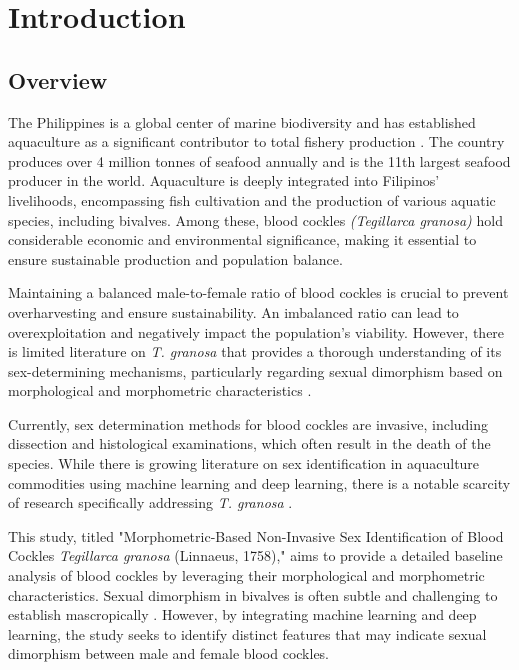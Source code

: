 \chapter{Introduction}
\label{sec:researchdesc}    %

\section{Overview}
\label{sec:overview}

The Philippines is a global center of marine biodiversity and has established aquaculture as a significant contributor to total fishery production \cite{aypa2000, bfar2019}. The country produces over 4 million tonnes of seafood annually and is the 11th largest seafood producer in the world. Aquaculture is deeply integrated into Filipinos' livelihoods, encompassing fish cultivation and the production of various aquatic species, including bivalves. Among these, blood cockles \textit{(Tegillarca granosa)} hold considerable economic and environmental significance, making it essential to ensure sustainable production and population balance.

Maintaining a balanced male-to-female ratio of blood cockles is crucial to prevent overharvesting and ensure sustainability. An imbalanced ratio can lead to overexploitation and negatively impact the population's viability. However, there is limited literature on \textit{T. granosa} that provides a thorough understanding of its sex-determining mechanisms, particularly regarding sexual dimorphism based on morphological and morphometric characteristics \cite{breton2017sex}.

Currently, sex determination methods for blood cockles are invasive, including dissection and histological examinations, which often result in the death of the species. While there is growing literature on sex identification in aquaculture commodities using machine learning and deep learning, there is a notable scarcity of research specifically addressing \textit{T. granosa} \cite{miranda2023}.

This study, titled "Morphometric-Based Non-Invasive Sex Identification of Blood Cockles \textit{Tegillarca granosa} (Linnaeus, 1758)," aims to provide a detailed baseline analysis of blood cockles by leveraging their morphological and morphometric characteristics. Sexual dimorphism in bivalves is often subtle and challenging to establish mascropically \cite{karapunar2021}. However, by integrating machine learning and deep learning, the study seeks to identify distinct features that may indicate sexual dimorphism between male and female blood cockles.

